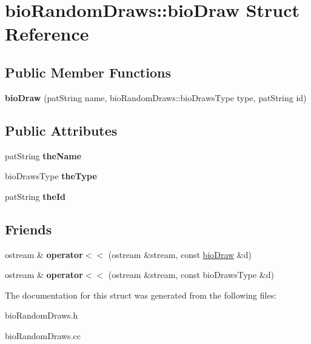 \hypertarget{structbio_random_draws_1_1bio_draw}{}\section{bio\+Random\+Draws\+:\+:bio\+Draw Struct Reference}
\label{structbio_random_draws_1_1bio_draw}
\subsection*{Public Member Functions}
\begin{DoxyCompactItemize}
\item 
\mbox{\label{structbio_random_draws_1_1bio_draw_aba1f67a5aa83f1e53c199126483afcf6}} 
{\bfseries bio\+Draw} (pat\+String name, bio\+Random\+Draws\+::bio\+Draws\+Type type, pat\+String id)
\end{DoxyCompactItemize}
\subsection*{Public Attributes}
\begin{DoxyCompactItemize}
\item 
\mbox{\label{structbio_random_draws_1_1bio_draw_a266e428815d9f3f1dfef4c8d690864d2}} 
pat\+String {\bfseries the\+Name}
\item 
\mbox{\label{structbio_random_draws_1_1bio_draw_a81e46c9531cb760ed5593c2935ffd5a3}} 
bio\+Draws\+Type {\bfseries the\+Type}
\item 
\mbox{\label{structbio_random_draws_1_1bio_draw_a87ed97a413961bbd92031150b4c9e758}} 
pat\+String {\bfseries the\+Id}
\end{DoxyCompactItemize}
\subsection*{Friends}
\begin{DoxyCompactItemize}
\item 
\mbox{\label{structbio_random_draws_1_1bio_draw_a452bbf92121021f2ad39e70f14e45dcc}} 
ostream \& {\bfseries operator$<$$<$} (ostream \&stream, const \hyperlink{structbio_random_draws_1_1bio_draw}{bio\+Draw} \&d)
\item 
\mbox{\label{structbio_random_draws_1_1bio_draw_a0078a1deb4556459d0a7b8ef4adeb4d2}} 
ostream \& {\bfseries operator$<$$<$} (ostream \&stream, const bio\+Draws\+Type \&d)
\end{DoxyCompactItemize}


The documentation for this struct was generated from the following files\+:\begin{DoxyCompactItemize}
\item 
bio\+Random\+Draws.\+h\item 
bio\+Random\+Draws.\+cc\end{DoxyCompactItemize}
